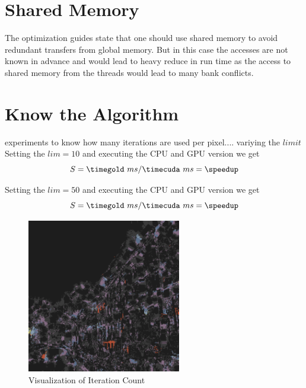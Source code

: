 \section{Shared Memory} %
\label{sec:shared_memory}
The optimization guides state that one should use shared memory to avoid 
redundant transfers from global memory. But in this case the accesses are not 
known in advance and would lead to heavy reduce in run time as the access to 
shared memory from the threads would lead to many bank conflicts. 

\section{Know the Algorithm} %
\label{sec:know_the_algo}

experiments to know how many iterations are used per pixel.... 
variying the $limit$
Setting the $lim = 10$ and executing the \gls{CPU} and \gls{GPU} version we get
\fpDiv{\speedup}{\tgold}{\tcuda}
\begin{equation*}\label{eq:speedup0}
	S = \timegold\ ms/\timecuda\ ms = \speedup
\end{equation*}


Setting the $lim = 50$ and executing the \gls{CPU} and \gls{GPU} version we get
\fpDiv{\speedup}{\tgold}{\tcuda}
\begin{equation*}\label{eq:speedup0}
	S = \timegold\ ms/\timecuda\ ms = \speedup
\end{equation*}


\begin{figure}[ht]
\centering
\includegraphics[width=0.6\textwidth]{gfx/itr_limitcycle0.pdf}
\caption{Visualization of Iteration Count}
\label{fig:vis_iteration_count}
\end{figure}

